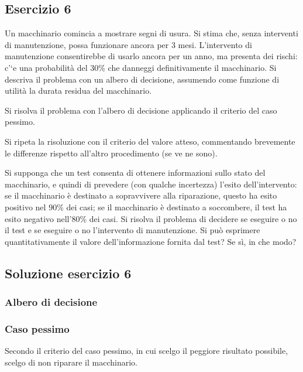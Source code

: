 \documentclass[\main/main.tex]{subfiles}
\begin{document}
\subsection{Esercizio 6}
Un macchinario comincia a mostrare segni di usura. Si stima che, senza interventi di manutenzione, possa funzionare ancora per 3 mesi. L'intervento di manutenzione consentirebbe di usarlo ancora per un anno, ma presenta dei rischi: c'`e una probabilità del 30\% che danneggi definitivamente il macchinario. Si descriva il problema con un albero di decisione, assumendo come funzione di utilità la durata residua del macchinario.

Si risolva il problema con l'albero di decisione applicando il criterio del caso pessimo.

Si ripeta la risoluzione con il criterio del valore atteso, commentando brevemente le differenze rispetto all'altro procedimento (se ve ne sono).

Si supponga che un test consenta di ottenere informazioni sullo stato del macchinario, e quindi di prevedere (con qualche incertezza) l'esito dell'intervento: se il macchinario è destinato a sopravvivere alla riparazione, questo ha esito positivo nel 90\% dei casi; se il macchinario è destinato a soccombere, il test ha esito negativo nell'80\% dei casi. Si risolva il problema di decidere se eseguire o no il test e se eseguire o no l'intervento di manutenzione.
Si può esprimere quantitativamente il valore dell'informazione fornita dal test? Se sì, in che modo?

\subsection{Soluzione esercizio 6}
\subsubsection*{Albero di decisione}
\begin{figure}
\end{figure}

\subsubsection*{Caso pessimo}
\begin{figure}
\end{figure}
Secondo il criterio del caso pessimo, in cui scelgo il peggiore risultato possibile, scelgo di non riparare il macchinario.
\end{document}
